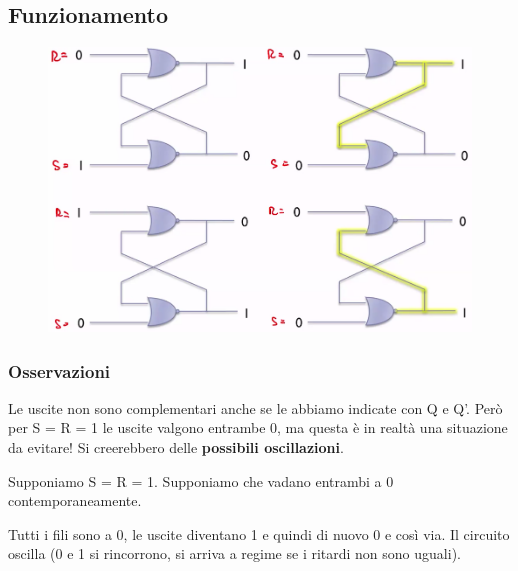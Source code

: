 

\newpage
\subsection{Funzionamento}

\begin{figure}[htbp]
    \centering
    \includegraphics[width=0.5\linewidth]{img/funz.png}
\end{figure}


\subsubsection{Osservazioni}

Le uscite non sono complementari anche se le abbiamo indicate con Q e Q'. Però per S = R = 1 le uscite valgono entrambe 0, ma questa è in realtà una situazione da evitare! Si creerebbero delle \textbf{possibili oscillazioni}.

Supponiamo S = R = 1. Supponiamo che vadano entrambi a 0 contemporaneamente.

Tutti i fili sono a 0, le uscite diventano 1 e quindi di nuovo 0 e così via. 
Il circuito oscilla (0 e 1 si rincorrono,
si arriva a regime se i ritardi non sono
uguali).

\paragraph{}


